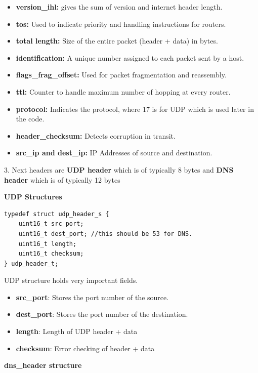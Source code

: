 \documentclass[12pt, a4paper]{report}
\begin{document}
\begin{itemize}
        \item \textbf{version\_ihl:} gives the sum of version and internet header length.
        \item \textbf{tos:} Used to indicate priority and handling instructions for routers.
        \item \textbf{total length:} Size of the entire packet (header + data) in bytes.
        \item \textbf{identification:} A unique number assigned to each packet sent by a host.
        \item \textbf{flags\_frag\_offset:} Used for packet fragmentation and reassembly.
        \item \textbf{ttl:} Counter to handle maximum number of hopping at every router.
        \item \textbf{protocol:} Indicates the protocol, where 17 is for UDP which is used later in the code.
        \item \textbf{header\_checksum:} Detects corruption in transit.
        \item \textbf{src\_ip and dest\_ip:} IP Addresses of source and destination.
\end{itemize}

3. Next headers are \textbf{UDP header} which is of typically 8 bytes and \textbf{DNS header} which is of typically 12 bytes

\textbf{UDP Structures}

\begin{lstlisting}[caption={UDP Header Structure}]
typedef struct udp_header_s {
    uint16_t src_port;
    uint16_t dest_port; //this should be 53 for DNS.
    uint16_t length;
    uint16_t checksum;
} udp_header_t;
\end{lstlisting}

UDP structure holds very important fields.

\begin{itemize}
        \item \textbf{src\_port}: Stores the port number of the source.
        \item \textbf{dest\_port}: Stores the port number of the destination.
        \item \textbf{length}: Length of UDP header + data
        \item \textbf{checksum}: Error checking of header + data
    \end{itemize}

\textbf{dns\_header structure}
\end{document}
